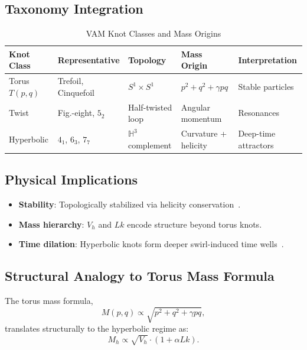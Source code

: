 \documentclass[a4paper,12pt]{article}
\begin{document}
        \subsection{Taxonomy Integration}

        \begin{table}[h]
        \centering
        \caption{VAM Knot Classes and Mass Origins}
        \begin{tabular}{|l|l|l|l|l|}
        \hline
        \textbf{Knot Class} & \textbf{Representative} & \textbf{Topology} & \textbf{Mass Origin} & \textbf{Interpretation} \\
        \hline
        Torus $T(p,q)$ & Trefoil, Cinquefoil & $S^1 \times S^1$ & $p^2 + q^2 + \gamma pq$ & Stable particles \\
        Twist & Fig.-eight, $5_2$ & Half-twisted loop & Angular momentum & Resonances \\
        Hyperbolic & $4_1$, $6_3$, $7_7$ & $\mathbb{H}^3$ complement & Curvature + helicity & Deep-time attractors \\
        \hline
        \end{tabular}
        \end{table}

        \subsection{Physical Implications}

        \begin{itemize}
            \item \textbf{Stability}: Topologically stabilized via helicity conservation~\cite{moffatt2014helicity}.
            \item \textbf{Mass hierarchy}: $V_h$ and $Lk$ encode structure beyond torus knots.
            \item \textbf{Time dilation}: Hyperbolic knots form deeper swirl-induced time wells~\cite{gibbons2002maximal}.
        \end{itemize}

        \subsection{Structural Analogy to Torus Mass Formula}

        The torus mass formula,
        \begin{equation}
            M(p,q) \propto \sqrt{p^2 + q^2 + \gamma pq},
        \end{equation}
        translates structurally to the hyperbolic regime as:
        \begin{equation}
            M_h \propto \sqrt{V_h} \cdot (1 + \alpha Lk).
        \end{equation}
\end{document}
